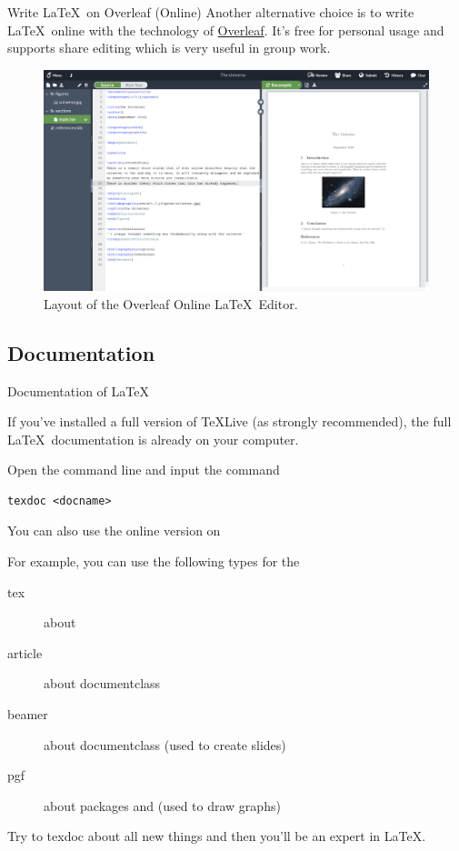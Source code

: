 \begin{frame}{Write \LaTeX\ on Overleaf (Online)}
	Another alternative choice is to write \LaTeX\ online with the technology of \href{https://www.overleaf.com/}{Overleaf}. It's free for personal usage and supports share editing which is very useful in group work.
	\begin{figure}
	\centering
	\includegraphics[width=0.7\linewidth]{../overleaf.png}
	\caption{Layout of the Overleaf Online \LaTeX\ Editor.}
	\end{figure}
\end{frame}

\subsection{Documentation}

\begin{frame}[fragile]{Documentation of \LaTeX}

	If you've installed a full version of \TeX Live (as strongly recommended), the full \LaTeX\ documentation is already on your computer. \medskip
	
	Open the command line and input the command 
	
\begin{command}
\begin{verbatim}
texdoc <docname>
\end{verbatim}
\end{command}
		
	You can also use the online version on  \medskip
	
	For example, you can use the following types for the 
	\begin{description}
		\item[tex] 		about \structure{\TeX}
		\item[article] 	about documentclass 
		\item[beamer] 	about documentclass  (used to create slides)
		\item[pgf]		about packages  and  (used to draw graphs)
	\end{description}
	\smallskip
	Try to \alert{texdoc} about all new things and then you'll be an expert in \LaTeX.
\end{frame}

